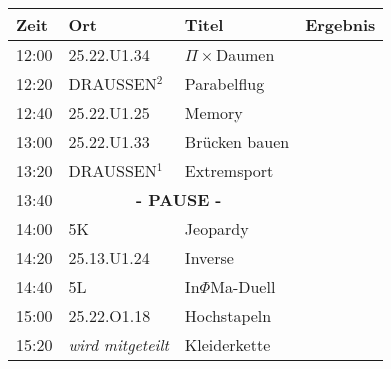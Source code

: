 \documentclass[a4paper,10pt]{article}
\def\spiela{25.22.U1.33 & Brücken bauen}
\def\spielb{DRAUSSEN$^1$ \footnotetext[1]{zwischen 25.22.U1 und 25.13.U1} & Extremsport}
\def\spielc{25.22.O1.18 & Hochstapeln}
\def\spield{5L & In$\Phi $Ma-Duell}
\def\spielee{ 25.13.U1.24 & Inverse}
\def\spielf{5K & Jeopardy}
\def\spielgg{25.22.U1.25 & Memory}
\def\spielh{DRAUSSEN$^2$ \footnotetext[2]{zwischen 25.22.U1 und 25.33.U1} & Parabelflug}
\def\spieli{ 25.22.U1.34 & $\Pi \times $Daumen}
\def\spielj{\textit{wird mitgeteilt} & Kleiderkette}
\def\pause{\multicolumn{2}{|c|}{\textbf{- PAUSE -}}}
\begin{document}
  \LARGE
  \begin{center}
  \vspace{1cm}
  \begin{tabularx}{\textwidth}{p{2.5cm}||p{4.5cm}|p{6.5cm}|l}

  \textbf{Zeit}  & \textbf{Ort} 	&\textbf{Titel} 		& \textbf{Ergebnis} 	\\ \hline \hline

  12:00 &\spieli			&		\\ \hline
  12:20 &\spielh			&		\\ \hline
  12:40 &\spielgg			&		\\ \hline

  13:00 &\spiela		 	&		\\ \hline
  13:20 &\spielb			&		\\ \hline
  13:40 &\pause			&		\\ \hline

  14:00 &\spielf			&		\\ \hline
  14:20 &\spielee			&		\\ \hline
  14:40 &\spield			&		\\ \hline 

  15:00 &\spielc			&		\\ \hline \hline
  15:20 &\spielj			&

  \end{tabularx}
  \end{center}
\end{document}
